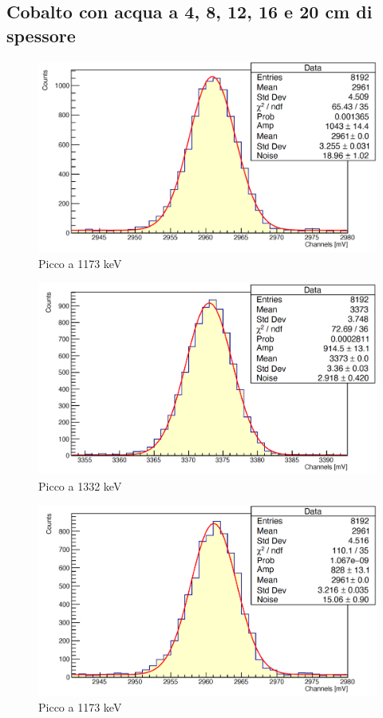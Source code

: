 \documentclass[a4paper,10pt]{article}
\begin{document}
\subsection{Cobalto con acqua a 4, 8, 12, 16 e 20 cm di spessore}
\begin{figure}[H]
    \centering
    \includegraphics[scale=0.45]{appendice/spettri/CoA1_4}
    \caption{Picco a 1173 keV}
\end{figure}
\begin{figure}[H]
    \centering
    \includegraphics[scale=0.45]{appendice/spettri/CoA2_4}
    \caption{Picco a 1332 keV}
\end{figure}
\begin{figure}[H]
    \centering
    \includegraphics[scale=0.45]{appendice/spettri/CoA1_8}
    \caption{Picco a 1173 keV}
\end{figure}
\end{document}
